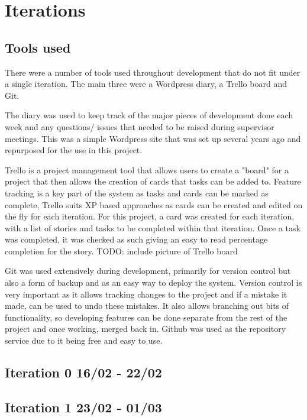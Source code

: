 \chapter{Iterations}
\section{Tools used}
There were a number of tools used throughout development that do not fit under a single iteration. The main three were a Wordpress diary, a Trello board and Git. 

The diary was used to keep track of the major pieces of development done each week and any questions/ issues that needed to be raised during supervisor meetings. This was a simple Wordpress site that was set up several years ago and repurposed for the use in this project.

Trello is a project management tool that allows users to create a "board" for a project that then allows the creation of cards that tasks can be added to\cite{trello}. Feature tracking is a key part of the system as tasks and cards can be marked as complete, Trello suits XP based approaches as cards can be created and edited on the fly for each iteration. For this project, a card was created for each iteration, with a list of stories and tasks to be completed within that iteration. Once a task was completed, it was checked as such giving an easy to read percentage completion for the story. TODO: include picture of Trello board

Git was used extensively during development, primarily for version control but also a form of backup and as an easy way to deploy the system. Version control is very important as it allows tracking changes to the project and if a mistake it made, can be used to undo these mistakes. It also allows branching out bits of functionality, so developing features can be done separate from the rest of the project and once working, merged back in. Github was used as the repository service due to it being free and easy to use\cite{github}.
\newpage

\section{Iteration 0 16/02 - 22/02}


\section{Iteration 1 23/02 - 01/03}


